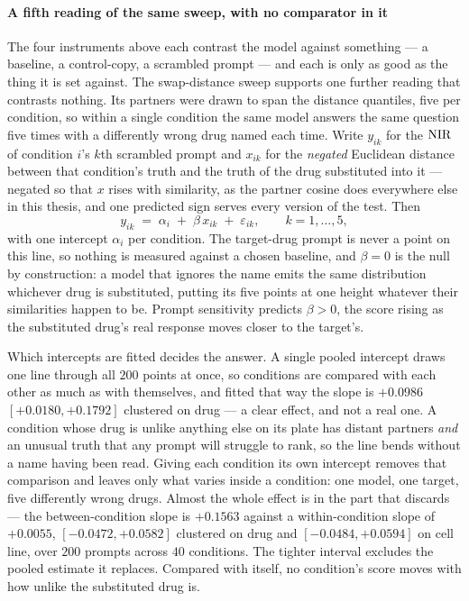     \paragraph{A fifth reading of the same sweep, with no comparator in it} 
    The four
  instruments above each contrast the model against something --- a baseline, a
  control-copy, a scrambled prompt --- and each is only as good as the thing it is
  set against. The swap-distance sweep supports one further reading that contrasts
  nothing. Its partners were drawn to span the distance quantiles, five per
  condition, so within a single condition the same model answers the same question
  five times with a differently wrong drug named each time. Write $y_{ik}$ for the
  $\textrm{NIR}$ of condition $i$'s $k$th scrambled prompt and $x_{ik}$ for the
  \emph{negated} Euclidean distance between that condition's truth and the truth of
  the drug substituted into it --- negated so that $x$ rises with similarity, as
  the partner cosine does everywhere else in this thesis, and one predicted sign
  serves every version of the test. Then
  \begin{equation}
   y_{ik} \;=\; \alpha_i \;+\; \beta\,x_{ik} \;+\; \varepsilon_{ik},
   \qquad k = 1,\dots,5,
  \end{equation}
  with one intercept $\alpha_i$ per condition. The target-drug prompt is never a
  point on this line, so nothing is measured against a chosen baseline, and
  $\beta = 0$ is the null by construction: a model that ignores the name emits the
  same distribution whichever drug is substituted, putting its five points at one
  height whatever their similarities happen to be. Prompt sensitivity predicts
  $\beta > 0$, the score rising as the substituted drug's real response moves
  closer to the target's.

  Which intercepts are fitted decides the answer. A single pooled intercept draws
  one line through all $200$ points at once, so conditions are compared with each
  other as much as with themselves, and fitted that way the slope is $+0.0986$
  $[+0.0180, +0.1792]$ clustered on drug --- a clear effect, and not a real one. A
  condition whose drug is unlike anything else on its plate has distant partners
  \emph{and} an unusual truth that any prompt will struggle to rank, so the line
  bends without a name having been read. Giving each condition its own intercept
  removes that comparison and leaves only what varies inside a condition: one
  model, one target, five differently wrong drugs. Almost the whole effect is in
  the part that discards --- the between-condition slope is $+0.1563$ against a
  within-condition slope of $+0.0055$, $[-0.0472, +0.0582]$ clustered on drug and
  $[-0.0484, +0.0594]$ on cell line, over $200$ prompts across $40$ conditions.
  The tighter interval excludes the pooled estimate it replaces. Compared with
  itself, no condition's score moves with how unlike the substituted drug is.

